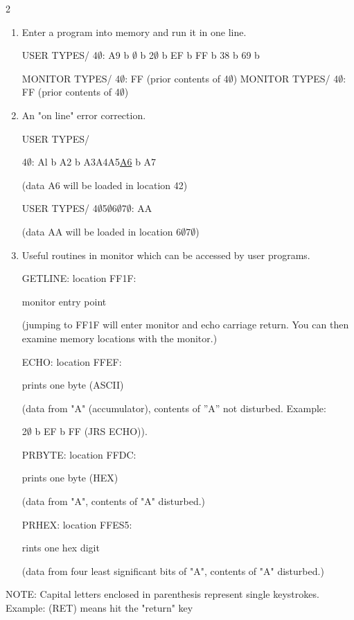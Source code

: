\documentclass[letterpaper]{article}
\begin{document}
\begin{multicols}{2}
\begin{enumerate}
USER TYPES/ 1$\emptyset$F$\emptyset$ (RET)

MONITOR TYPES/ 1$\emptyset$F$\emptyset$: A9

USER TYPES/ R (RET)

\item Enter a program into memory and run it in one line.

USER TYPES/ 4$\emptyset$: A9 b $\emptyset$ b 2$\emptyset$ b EF b FF b 38 b 69 b

MONITOR TYPES/ 4$\emptyset$: FF (prior contents of 4$\emptyset$)
MONITOR TYPES/ 4$\emptyset$: FF (prior contents of 4$\emptyset$)

\item An "on line" error correction.

USER TYPES/

4$\emptyset$: Al b A2 b A3A4A5\underline{A6} b A7

 (data A6 will be loaded in location 42)
 
 USER TYPES/ 4$\emptyset$5$\emptyset$6$\emptyset$7$\emptyset$: AA

 (data AA will be loaded in location 6$\emptyset$7$\emptyset$)

 \item Useful routines in monitor which can be accessed by user programs.
 
 GETLINE: location FF1F:
 
 monitor entry point

(jumping to FF1F will enter monitor and echo carriage return. You can then examine memory locations with the monitor.)

ECHO: location FFEF:

prints one byte (ASCII)

(data from "A" (accumulator), contents of ''A'' not disturbed. Example:

2$\emptyset$ b EF b FF (JRS ECHO)).

PRBYTE: location FFDC:

prints one byte (HEX)

(data from "A", contents of "A" disturbed.) 

PRHEX: location FFES5:

rints one hex digit

(data from four least significant bits of "A", contents of "A" disturbed.)
\end{enumerate}
\end{multicols}
\begin{center}
NOTE: Capital letters enclosed in parenthesis represent single keystrokes.
Example: (RET) means hit the "return" key
\end{center}
\end{document}
